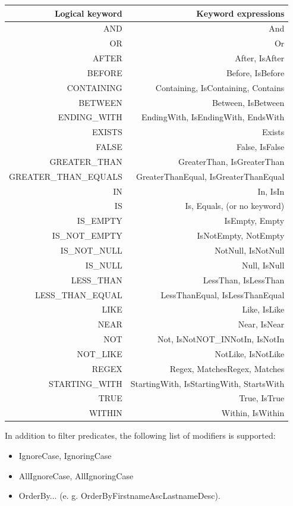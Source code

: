 \documentclass{scrartcl}
\begin{document}
\begin{table}[ht]
\begin{tabular}{ | r | r |}
    \hline
    Logical keyword &	Keyword expressions \\
    \hline
    AND & And \\
    OR &  Or \\
    AFTER & After, IsAfter \\
    BEFORE & Before, IsBefore\\
    CONTAINING&Containing, IsContaining, Contains\\
    BETWEEN&Between, IsBetween\\
    ENDING\_WITH&EndingWith, IsEndingWith, EndsWith\\
    EXISTS&Exists\\
    FALSE&False, IsFalse\\
    GREATER\_THAN&GreaterThan, IsGreaterThan\\
    GREATER\_THAN\_EQUALS&GreaterThanEqual, IsGreaterThanEqual\\
    IN&In, IsIn\\
    IS&Is, Equals, (or no keyword)\\
    IS\_EMPTY&IsEmpty, Empty\\
    IS\_NOT\_EMPTY&IsNotEmpty, NotEmpty\\
    IS\_NOT\_NULL&NotNull, IsNotNull\\
    IS\_NULL&Null, IsNull\\
    LESS\_THAN&LessThan, IsLessThan\\
    LESS\_THAN\_EQUAL&LessThanEqual, IsLessThanEqual\\
    LIKE&Like, IsLike\\
    NEAR&Near, IsNear\\
    NOT&Not, IsNotNOT\_INNotIn, IsNotIn\\
    NOT\_LIKE&NotLike, IsNotLike\\
    REGEX&Regex, MatchesRegex, Matches\\
    STARTING\_WITH&StartingWith, IsStartingWith, StartsWith\\
    TRUE&True, IsTrue\\
    WITHIN&Within, IsWithin\\
    \hline
\end{tabular}
\end{table}

    In addition to filter predicates, the following list of modifiers is supported:
    \begin{itemize}
        \item IgnoreCase, IgnoringCase
        \item AllIgnoreCase, AllIgnoringCase
        \item OrderBy... (e. g. OrderByFirstnameAscLastnameDesc).
    \end{itemize}
\end{document}
